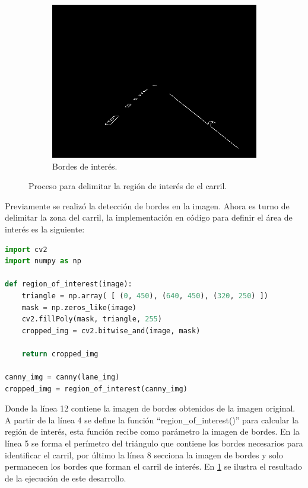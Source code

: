 \begin{figure}[h]
     \begin{subfigure}[b]{0.3\textwidth}
         \centering
         \includegraphics[width=\textwidth]{Figures/Figures_Cap04/lanes_cropped.png}
         \caption{Bordes de interés.}
         \label{fig:lanes_interest}
     \end{subfigure}
     
    \caption{Proceso para delimitar la región de interés de el carril.}
    \label{fig:interest_region}
\end{figure}

\newpage
Previamente se realizó la detección de bordes en la imagen. Ahora es turno de delimitar la zona del carril, la implementación en código para definir el área de interés es la siguiente:

\hfill
\begin{lstlisting}[language=Python]
import cv2
import numpy as np

def region_of_interest(image):
    triangle = np.array( [ (0, 450), (640, 450), (320, 250) ])
    mask = np.zeros_like(image)
    cv2.fillPoly(mask, triangle, 255)
    cropped_img = cv2.bitwise_and(image, mask)
    
    return cropped_img

canny_img = canny(lane_img)                                                 
cropped_img = region_of_interest(canny_img)         
\end{lstlisting}
\hfill

Donde la línea 12 contiene la imagen de bordes obtenidos de la imagen original. A partir de la línea 4 se define la función ``region\_of\_interest()'' para calcular la región de interés, esta función recibe como parámetro la imagen de bordes. En la línea 5 se forma el perímetro del triángulo que contiene los bordes necesarios para identificar el carril, por último la línea 8 secciona la imagen de bordes y solo permanecen los bordes que forman el carril de interés. En \ref{fig:lanes_interest} se ilustra el resultado de la ejecución de este desarrollo.

